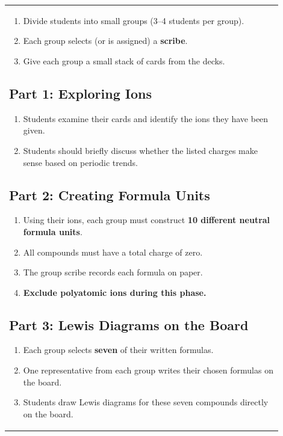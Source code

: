 \documentclass{article}
\begin{document}
\begin{flushleft}
\begin{tabular}{|p{0.9\linewidth}|}
\begin{enumerate}
    \item Divide students into small groups (3--4 students per group).
    \item Each group selects (or is assigned) a \textbf{scribe}.
    \item Give each group a small stack of cards from the decks.
\end{enumerate}

\subsection*{Part 1: Exploring Ions}

\begin{enumerate}
    \item Students examine their cards and identify the ions they have been given.
    \item Students should briefly discuss whether the listed charges make sense based on periodic trends.
\end{enumerate}

\subsection*{Part 2: Creating Formula Units}

\begin{enumerate}
    \item Using their ions, each group must construct \textbf{10 different neutral formula units}.
    \item All compounds must have a total charge of zero.
    \item The group scribe records each formula on paper.
    \item \textbf{Exclude polyatomic ions during this phase.}
\end{enumerate}

\subsection*{Part 3: Lewis Diagrams on the Board}

\begin{enumerate}
    \item Each group selects \textbf{seven} of their written formulas.
    \item One representative from each group writes their chosen formulas on the board.
    \item Students draw Lewis diagrams for these seven compounds directly on the board.
\end{enumerate}


\end{tabular}
\end{flushleft}
\end{document}
